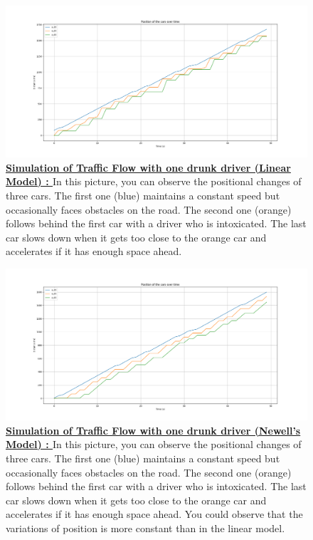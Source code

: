 \documentclass{article}
\begin{document}
		\begin{figure}[H]
			\centering
			\includegraphics[width=\textwidth]{Model1W3C_O_Aco_D2_Linear.png}
			\caption[Simulation of Traffic Flow with one drunk driver (Linear Model).]{\textbf{\underline{Simulation of Traffic Flow with one drunk driver (Linear Model) : }} In this picture, you can observe the positional changes of three cars. The first one (blue) maintains a constant speed but occasionally faces obstacles on the road. The second one (orange) follows behind the first car with a driver who is intoxicated. The last car slows down when it gets too close to the orange car and accelerates if it has enough space ahead.}
			\label{fig:Model1W3C_O_Aco_D2_Linear}
		\end{figure}
		
		\begin{figure}[H]
		\centering
		\includegraphics[width=\textwidth]{Model1W3C_O_Aco_D2_Newell.png}
		\caption[Simulation of Traffic Flow with one drunk driver (Newell's Model).]{\textbf{\underline{Simulation of Traffic Flow with one drunk driver (Newell's Model) : }} In this picture, you can observe the positional changes of three cars. The first one (blue) maintains a constant speed but occasionally faces obstacles on the road. The second one (orange) follows behind the first car with a driver who is intoxicated. The last car slows down when it gets too close to the orange car and accelerates if it has enough space ahead. You could observe that the variations of position is more constant than in the linear model.}
		\label{fig:Model1W3C_O_Aco_D2_Newell}
	\end{figure}
		
\end{document}
